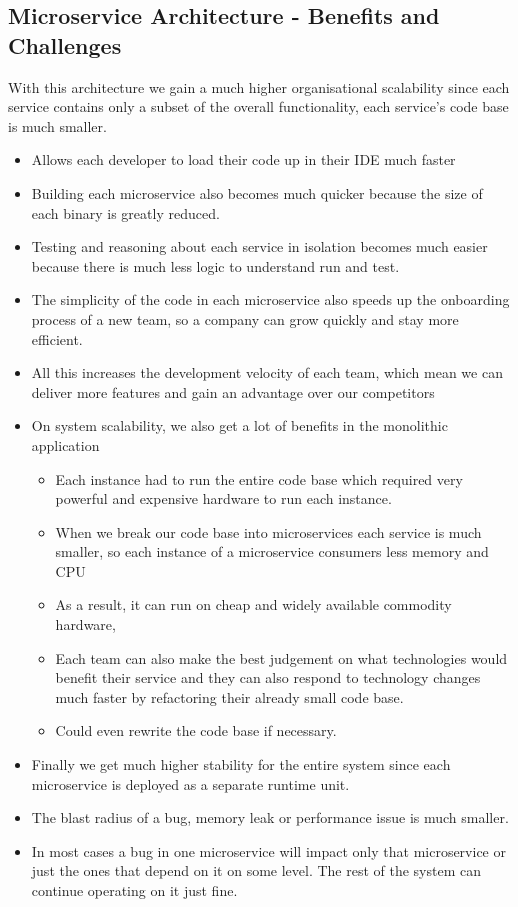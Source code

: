 \subsection{Microservice Architecture - Benefits and Challenges}
With this architecture we gain a much higher organisational scalability since each service contains only a subset of the overall functionality, each service's code base is much smaller.
\begin{itemize}
    \item Allows each developer to load their code up in their IDE much faster
    \item Building each microservice also becomes much quicker because the size of each binary is greatly reduced.
    \item Testing and reasoning about each service in isolation becomes much easier because there is much less logic to understand run and test.
    \item The simplicity of the code in each microservice also speeds up the onboarding process of a new team, so a company can grow quickly and stay more efficient.
    \item All this increases the development velocity of each team, which mean we can deliver more features and gain an advantage over our competitors
    \item On system scalability, we also get a lot of benefits in the monolithic application
    \begin{itemize}
        \item Each instance had to run the entire code base which required very powerful and expensive hardware to run each instance.
        \item When we break our code base into microservices each service is much smaller, so each instance of a microservice consumers less memory and CPU
        \item As a result, it can run on cheap and widely available commodity hardware,
        \item Each team can also make the best judgement on what technologies would benefit their service and they can also respond to technology changes much faster by refactoring their already small code base.
        \item Could even rewrite the code base if necessary.
    \end{itemize}
    \item Finally we get much higher stability for the entire system since each microservice is deployed as a separate runtime unit.
    \item The blast radius of a bug, memory leak or performance issue is much smaller.
    \item In most cases a bug in one microservice will impact only that microservice or just the ones that depend on it on some level. The rest of the system can continue operating on it just fine.
\end{itemize}

